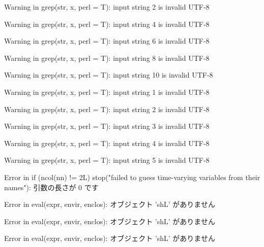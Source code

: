 \begin{Schunk}
\begin{Soutput}
Warning in grep(str, x, perl = T): input string 2 is invalid UTF-8
\end{Soutput}
\begin{Soutput}
Warning in grep(str, x, perl = T): input string 4 is invalid UTF-8
\end{Soutput}
\begin{Soutput}
Warning in grep(str, x, perl = T): input string 6 is invalid UTF-8
\end{Soutput}
\begin{Soutput}
Warning in grep(str, x, perl = T): input string 8 is invalid UTF-8
\end{Soutput}
\begin{Soutput}
Warning in grep(str, x, perl = T): input string 10 is invalid UTF-8
\end{Soutput}
\begin{Soutput}
Warning in grep(str, x, perl = T): input string 1 is invalid UTF-8
\end{Soutput}
\begin{Soutput}
Warning in grep(str, x, perl = T): input string 2 is invalid UTF-8
\end{Soutput}
\begin{Soutput}
Warning in grep(str, x, perl = T): input string 3 is invalid UTF-8
\end{Soutput}
\begin{Soutput}
Warning in grep(str, x, perl = T): input string 4 is invalid UTF-8
\end{Soutput}
\begin{Soutput}
Warning in grep(str, x, perl = T): input string 5 is invalid UTF-8
\end{Soutput}
\begin{Soutput}
Error in if (ncol(nn) != 2L) stop("failed to guess time-varying variables from their names"): 引数の長さが 0 です
\end{Soutput}
\begin{Soutput}
Error in eval(expr, envir, enclos): オブジェクト 'shL' がありません
\end{Soutput}
\begin{Soutput}
Error in eval(expr, envir, enclos): オブジェクト 'shL' がありません
\end{Soutput}
\begin{Soutput}
Error in eval(expr, envir, enclos): オブジェクト 'shL' がありません
\end{Soutput}
\begin{Soutput}

\end{Soutput}
\end{Schunk}
